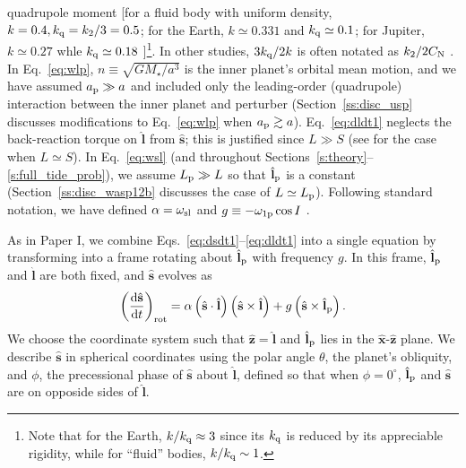 \documentclass[
        fleqn,
        usenatbib,
        referee
    ]{mnras}
\newcommand*{\rd}[2]{\frac{\mathrm{d}#1}{\mathrm{d}#2}}
\newcommand*{\p}[1]{\left(#1\right)}
\newcommand*{\uv}[1]{\hat{\boldsymbol{\mathbf{#1}}}}
\begin{document}
quadrupole moment [for a fluid body with uniform density, $k=0.4, k_{\rm
q} = k_2/3 = 0.5$; for the Earth, $k \simeq 0.331$ and $k_{\rm q} \simeq 0.1$;
for Jupiter, $k \simeq 0.27$ whle $k_{\rm q} \simeq 0.18$
\citep[e.g.][]{groten2004fundamental, lainey2016quantification}]\footnote{Note
that for the Earth, $k / k_{\rm q} \approx 3$ since its $k_{\rm q}$ is reduced
by its appreciable rigidity, while for ``fluid'' bodies, $k / k_{\rm q} \sim
1$.}. In other studies, $3k_{\rm q} / 2 k$ is often notated as $k_2 / 2C_{\rm
N}$ \citep[e.g.][]{millholland_disk}. In Eq.~\eqref{eq:wlp}, $n \equiv
\sqrt{GM_\star/a^3}$ is the inner planet's orbital mean motion,  and we have
assumed $a_{\rm p}\gg a$ and included only the leading-order (quadrupole)
interaction between the inner planet and perturber
(Section~\ref{ss:disc_usp} discusses modifications to Eq.~\ref{eq:wlp}
when $a_{\rm p} \gtrsim a$). Eq.~\eqref{eq:dldt1} neglects the back-reaction
torque on $\uv{l}$ from $\uv{s}$; this is justified since $L \gg S$ (see
\citealp{anderson2018teeter} for the case when $L \simeq S$). In
Eq.~\eqref{eq:wsl} (and throughout
Sections~\ref{s:theory}--\ref{s:full_tide_prob}), we assume $L_{\rm p} \gg L$
so that $\uv{l}_{\rm p}$ is a constant (Section~\ref{ss:disc_wasp12b} discusses
the case of $L \simeq L_{\rm p}$). Following standard notation, we have defined
$\alpha = \omega_{\rm sl}$ and $g \equiv -\omega_{\rm 1p} \cos I$
\citep[e.g.][]{colombo1966}.

As in Paper I, we combine Eqs.~\eqref{eq:dsdt1}--\eqref{eq:dldt1} into a
single equation by transforming into a frame rotating about $\uv{l}_{\rm p}$
with frequency $g$. In this frame, $\uv{l}_{\rm p}$ and $\uv{l}$ are both fixed,
and $\uv{s}$ evolves as
\begin{equation}
    \p{\rd{\uv{s}}{t}}_{\rm rot}
        = \alpha\p{\uv{s} \cdot \uv{l}}\p{\uv{s} \times \uv{l}}
            + g\p{\uv{s} \times \uv{l}_{\rm p}}. \label{eq:dsdt_rot}
\end{equation}
We choose the coordinate system such that $\uv{z} = \uv{l}$ and $\uv{l}_{\rm p}$
lies in the $\uv{x}$-$\uv{z}$ plane. We describe $\uv{s}$ in spherical
coordinates using the polar angle $\theta$, the planet's obliquity, and $\phi$,
the precessional phase of $\uv{s}$ about $\uv{l}$, defined so that when $\phi =
0^\circ$, $\uv{l}_{\rm p}$ and $\uv{s}$ are on opposide sides of $\uv{l}$.
\end{document}
